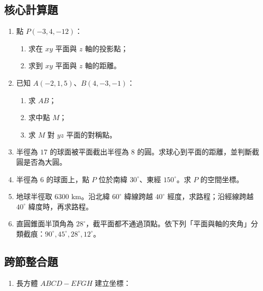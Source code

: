 \documentclass[11pt,a4paper]{article}
\providecommand{\tightlist}{%
  \setlength{\itemsep}{0pt}\setlength{\parskip}{0pt}}
\begin{document}
\subsection{核心計算題}\label{ux6838ux5fc3ux8a08ux7b97ux984c}

\begin{enumerate}
\def\labelenumi{\arabic{enumi}.}
\setcounter{enumi}{6}
\item
  點 \(P(-3,4,-12)\)：

  \begin{enumerate}
  \def\labelenumii{\arabic{enumii}.}
  \tightlist
  \item
    求在 \(xy\) 平面與 \(z\) 軸的投影點；
  \item
    求到 \(xy\) 平面與 \(z\) 軸的距離。
  \end{enumerate}
\item
  已知 \(A(-2,1,5)\)、\(B(4,-3,-1)\)：

  \begin{enumerate}
  \def\labelenumii{\arabic{enumii}.}
  \tightlist
  \item
    求 \(AB\)；
  \item
    求中點 \(M\)；
  \item
    求 \(M\) 對 \(yz\) 平面的對稱點。
  \end{enumerate}
\item
  半徑為 \(17\) 的球面被平面截出半徑為 \(8\) 的圓。求球心到平面的距離，並判斷截圓是否為大圓。
\item
  半徑為 \(6\) 的球面上，點 \(P\) 位於南緯 \(30^\circ\)、東經 \(150^\circ\)。求 \(P\) 的空間坐標。
\item
  地球半徑取 \(6300\text{ km}\)。沿北緯 \(60^\circ\) 緯線跨越 \(40^\circ\) 經度，求路程；沿經線跨越 \(40^\circ\) 緯度時，再求路程。
\item
  直圓錐面半頂角為 \(28^\circ\)，截平面都不通過頂點。依下列「平面與軸的夾角」分類截痕：\(90^\circ,45^\circ,28^\circ,12^\circ\)。
\end{enumerate}

\subsection{跨節整合題}\label{ux8de8ux7bc0ux6574ux5408ux984c}

\begin{enumerate}
\def\labelenumi{\arabic{enumi}.}
\setcounter{enumi}{12}
\tightlist
\item
  長方體 \(ABCD-EFGH\) 建立坐標：
\end{enumerate}
\end{document}
